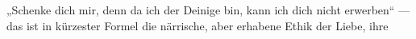 „Schenke dich mir, denn da ich der Deinige bin, kann ich dich nicht erwerben“ — das ist in kürzester Formel die närrische, aber erhabene Ethik der Liebe, ihre 
\par

